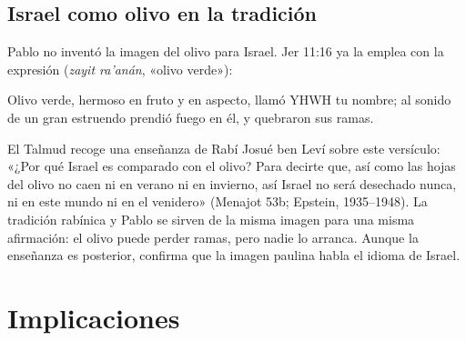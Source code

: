 \subsection{Israel como olivo en la tradición}
Pablo no inventó la imagen del olivo para Israel. Jer 11:16 ya la emplea con la expresión  (\emph{zayit ra'anán}, «olivo verde»):
\begin{cita}Olivo verde, hermoso en fruto y en aspecto, llamó YHWH tu nombre; al sonido de un gran estruendo prendió fuego en él, y quebraron sus ramas.\end{cita}
El Talmud recoge una enseñanza de Rabí Josué ben Leví sobre este versículo: «¿Por qué Israel es comparado con el olivo? Para decirte que, así como las hojas del olivo no caen ni en verano ni en invierno, así Israel no será desechado nunca, ni en este mundo ni en el venidero» (Menajot 53b; Epstein, 1935--1948). La tradición rabínica y Pablo se sirven de la misma imagen para una misma afirmación: el olivo puede perder ramas, pero nadie lo arranca. Aunque la enseñanza es posterior, confirma que la imagen paulina habla el idioma de Israel.

\section{Implicaciones}

